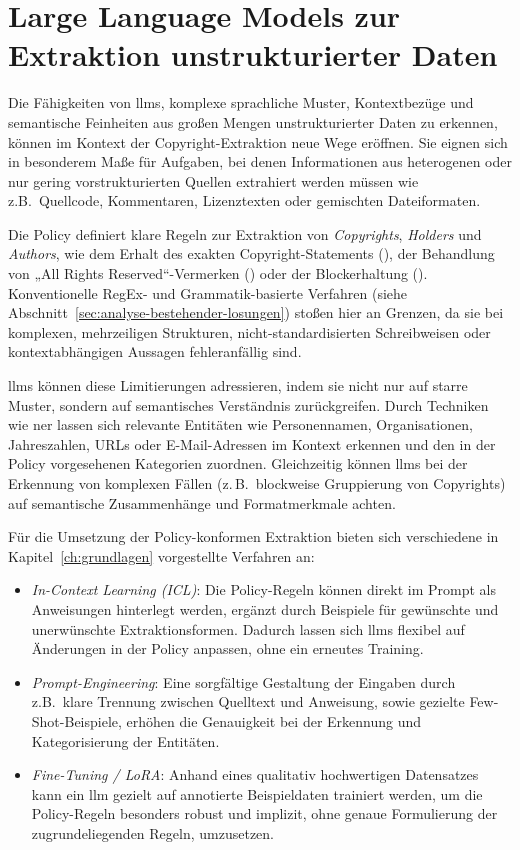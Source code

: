 \section{Large Language Models zur Extraktion unstrukturierter Daten}\label{sec:vorstellung-llm}

Die Fähigkeiten von \glspl{llm}, komplexe sprachliche Muster, Kontextbezüge und semantische Feinheiten aus großen Mengen unstrukturierter Daten zu erkennen, können im Kontext der Copyright-Extraktion neue Wege eröffnen.
Sie eignen sich in besonderem Maße für Aufgaben, bei denen Informationen aus heterogenen oder nur gering vorstrukturierten Quellen extrahiert werden müssen wie z.B.\ Quellcode, Kommentaren, Lizenztexten oder gemischten Dateiformaten.

Die Policy definiert klare Regeln zur Extraktion von \textit{Copyrights}, \textit{Holders} und \textit{Authors}, wie dem Erhalt des exakten Copyright-Statements (), der Behandlung von „All Rights Reserved“-Vermerken () oder der Blockerhaltung ().
Konventionelle RegEx- und Grammatik-basierte Verfahren (siehe Abschnitt~\ref{sec:analyse-bestehender-losungen}) stoßen hier an Grenzen, da sie bei komplexen, mehrzeiligen Strukturen, nicht-standardisierten Schreibweisen oder kontextabhängigen Aussagen fehleranfällig sind.

\glspl{llm} können diese Limitierungen adressieren, indem sie nicht nur auf starre Muster, sondern auf semantisches Verständnis zurückgreifen.
Durch Techniken wie \gls{ner} lassen sich relevante Entitäten wie Personennamen, Organisationen, Jahreszahlen, URLs oder E-Mail-Adressen im Kontext erkennen und den in der Policy vorgesehenen Kategorien zuordnen.
Gleichzeitig können \glspl{llm} bei der Erkennung von komplexen Fällen (z.\,B.\ blockweise Gruppierung von Copyrights) auf semantische Zusammenhänge und Formatmerkmale achten.

Für die Umsetzung der Policy-konformen Extraktion bieten sich verschiedene in Kapitel~\ref{ch:grundlagen} vorgestellte Verfahren an:
\begin{itemize}
    \item \textit{In-Context Learning (ICL)}: Die Policy-Regeln können direkt im Prompt als Anweisungen hinterlegt werden, ergänzt durch Beispiele für gewünschte und unerwünschte Extraktionsformen. Dadurch lassen sich \glspl{llm} flexibel auf Änderungen in der Policy anpassen, ohne ein erneutes Training.
    \item \textit{Prompt-Engineering}: Eine sorgfältige Gestaltung der Eingaben durch z.B.\ klare Trennung zwischen Quelltext und Anweisung, sowie gezielte Few-Shot-Beispiele, erhöhen die Genauigkeit bei der Erkennung und Kategorisierung der Entitäten.
    \item \textit{Fine-Tuning / LoRA}: Anhand eines qualitativ hochwertigen Datensatzes kann ein \gls{llm} gezielt auf annotierte Beispieldaten trainiert werden, um die Policy-Regeln besonders robust und implizit, ohne genaue Formulierung der zugrundeliegenden Regeln, umzusetzen.
\end{itemize}

